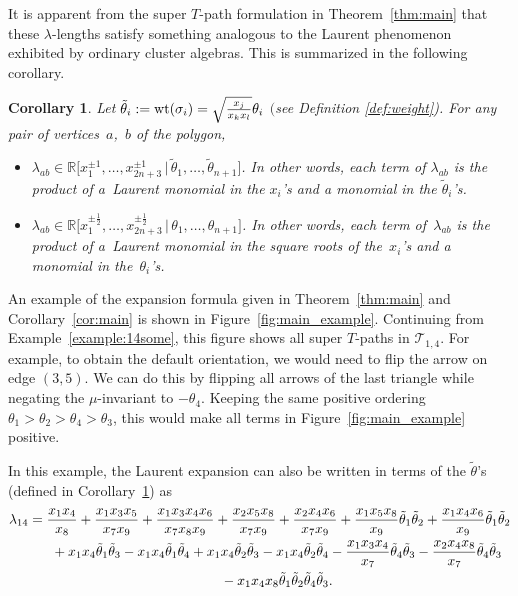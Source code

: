 \documentclass[pdftex]{sigma}
\numberwithin{equation}{section}
\newtheorem{Corollary}[Theorem]{Corollary}
\begin{document}
It is apparent from the super $T$-path formulation in Theorem~\ref{thm:main} that these $\lambda$-lengths satisfy something analogous
to the Laurent phenomenon exhibited by ordinary cluster algebras. This is summarized in the following corollary.

\begin{Corollary}\label{cor:laurent}
 Let $\tilde{\theta}_i := {\rm wt}(\sigma_i) = \sqrt{\frac{x_j}{x_kx_l}} \theta_i$ $($see Definition {\rm \ref{def:weight})}.
 For any pair of vertices~$a$,~$b$ of the polygon,
 \begin{itemize}\itemsep=0pt
 \item[$(a)$] $\lambda_{ab} \in {\mathbb R}\bigl[x_1^{\pm 1}, \dots, x_{2n+3}^{\pm 1} \,|\, \tilde{\theta}_1, \dots, \tilde{\theta}_{n+1}\bigr]$.
 In other words, each term of $\lambda_{ab}$ is the product of a~Laurent monomial
 in the $x_i$'s and a monomial in the $\tilde{\theta}_i$'s.
 \item[$(b)$] $\lambda_{ab} \in {\mathbb R}\bigl[x_{1}^{\pm \frac{1}{2}}, \dots, x_{2n+3}^{\pm \frac{1}{2}} \,|\, \theta_1, \dots, \theta_{n+1}\bigr]$.
 In other words, each term of~$\lambda_{ab}$ is the product of a~Laurent monomial in the square roots of the~$x_i$'s
 and a monomial in the~$\theta_i$'s.
 \end{itemize}
\end{Corollary}



\begin{Example}\label{example:main}\rm
An example of the expansion formula given in Theorem~\ref{thm:main} and Corollary~\ref{cor:main} is shown in Figure~\ref{fig:main_example}. Continuing from Example~\ref{example:14some},
this figure shows all super $T$-paths in $\mathcal{T}_{1,4}$. For example, to obtain the default orientation, we would need to flip the arrow on edge $(3,5)$.
We can do this by flipping all arrows of the last triangle while negating the $\mu$-invariant to $-\theta_4$.
Keeping the same positive ordering $\theta_1>\theta_2>\theta_4>\theta_3$, this would make all terms in Figure~\ref{fig:main_example} positive.

In this example, the Laurent expansion can also be written in terms of the $\tilde \theta$'s (defined in Corollary~\ref{cor:laurent}) as
\begin{gather*}
\lambda_{14}=\frac{x_1x_4}{x_8}+\frac{x_1 x_3 x_5}{x_7 x_9}+\frac{x_1x_3x_4x_6}{x_7x_8x_9}+\frac{x_2x_5x_8}{x_7x_9} +\frac{x_2x_4x_6}{x_7x_9}+\frac{x_1x_5x_8}{x_9}\tilde\theta_1\tilde\theta_2 +\frac{x_1x_4x_6}{x_9}\tilde\theta_1\tilde\theta_2\\
\hphantom{\lambda_{14}=}{}
+x_1x_4\tilde\theta_1\tilde\theta_3-x_1x_4\tilde\theta_1\tilde\theta_4 +x_1x_4\tilde\theta_2\tilde\theta_3
-x_1x_4\tilde\theta_2\tilde\theta_4
-\frac{x_1x_3x_4}{x_7}\tilde\theta_4\tilde\theta_3
-\frac{x_2x_4x_8}{x_7}\tilde\theta_4\tilde\theta_3\\
\hphantom{\lambda_{14}=}{}
-x_1x_4x_8\tilde\theta_1\tilde\theta_2\tilde\theta_4\tilde\theta_3.
\end{gather*}
\end{Example}
\end{document}

